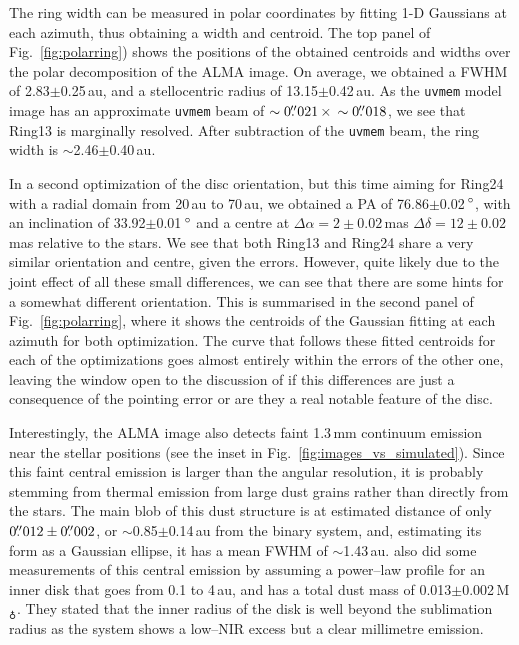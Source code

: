 \documentclass[fleqn,usenatbib,useAMS]{mnras}
\begin{document}
The ring width can be measured in polar coordinates by fitting 1-D Gaussians at each azimuth, thus obtaining a width and centroid. The top panel of Fig.~\ref{fig:polarring}) shows the positions of the obtained centroids and widths over the polar decomposition of the ALMA image. On average, we obtained a FWHM of 2.83$\pm$0.25\,au, and a stellocentric radius of 13.15$\pm$0.42\,au. As the {\tt uvmem} model image has an approximate {\tt uvmem} beam of $\sim0\hbox{$.\!\!^{\prime\prime}$}021 \,\times \,\sim0\hbox{$.\!\!^{\prime\prime}$}018$, we see that Ring13 is marginally resolved. After subtraction of the {\tt uvmem} beam, the ring width is $\sim$2.46$\pm$0.40\,au.

In a second optimization of the disc orientation, but this time aiming for Ring24 with a radial domain from 20\,au to 70\,au, we obtained a PA of 76.86$\pm$0.02\,$\hbox{$^\circ$}$, with an inclination of 33.92$\pm$0.01\,$\hbox{$^\circ$}$ and a centre at $\Delta \alpha = 2\pm0.02$\,mas $\Delta \delta = 12\pm0.02$\,mas relative to the stars. We see that both Ring13 and Ring24 share a very similar orientation and centre, given the errors. However, quite likely due to the joint effect of all these small differences, we can see that there are some hints for a somewhat different orientation. This is summarised in the second panel of Fig.~\ref{fig:polarring}, where it shows the centroids of the Gaussian fitting at each azimuth for both optimization. The curve that follows these fitted centroids for each of the optimizations goes almost entirely within the errors of the other one, leaving the window open to the discussion of if this differences are just a consequence of the pointing error or are they a real notable feature of the disc.

Interestingly, the ALMA image also detects faint 1.3\,mm continuum emission near the stellar positions (see the inset in Fig.~\ref{fig:images_vs_simulated}). Since this faint central emission is larger than the angular resolution, it is probably stemming from thermal emission from large dust grains rather than directly from the stars. The main blob of this dust structure is at estimated distance of only $0\hbox{$.\!\!^{\prime\prime}$}012\pm0\hbox{$.\!\!^{\prime\prime}$}002$, or $\sim$0.85$\pm$0.14\,au from the binary system, and, estimating its form as a Gaussian ellipse, it has a mean FWHM of $\sim$1.43\,au. \citet{Francis_2020} also did some measurements of this central emission by assuming a power--law profile for an inner disk that goes from 0.1 to 4\,au, and has a total dust mass of 0.013$\pm$0.002\,M$_{\earth}$. They stated that the inner radius of the disk is well beyond the sublimation radius as the system shows a low--NIR excess but a clear millimetre emission.
\end{document}
